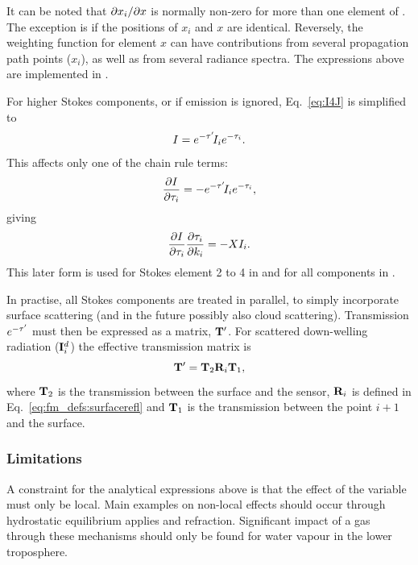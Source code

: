 It can be noted that $\partial x_i/\partial x$ is normally non-zero for more than
one element of \SttVct. The exception is if the positions of $x_i$ and $x$ are
identical. Reversely, the weighting function for element $x$ can have
contributions from several propagation path points ($x_i$), as well as from
several radiance spectra.
The expressions above are implemented in .

For higher Stokes components, or if emission is ignored, Eq.~\ref{eq:I4J} is
simplified to
\begin{equation}
  \label{eq:Q4J}
  I = e^{-\tau'}\!I_ie^{-\tau_{i}}.
\end{equation}
This affects only one of the chain rule terms:
\begin{equation}
  \frac{\partial I}{\partial \tau_{i}} 
      = -e^{-\tau'}\!I_i e^{-\tau_{i}},
\end{equation}
giving
\begin{equation}
  \frac{\partial I}{\partial \tau_{i}}\frac{\partial \tau_{i}}{\partial k_i} =
  -X I_i.
\end{equation}
This later form is used for Stokes element 2 to 4 in
 and for all components in
.

In practise, all Stokes components are treated in parallel, to simply
incorporate surface scattering (and in the future possibly also cloud
scattering). Transmission $e^{-\tau'}$ must then be expressed as a matrix,
$\mathbf{T}'$. For scattered down-welling radiation (${\bf I}^d_i$) the
effective transmission matrix is
\begin{equation}
  \mathbf{T}' = \mathbf{T}_2\mathbf{R}_i\mathbf{T}_1,
\end{equation}
where $\mathbf{T}_2$ is the transmission between the surface and the sensor,
$\mathbf{R}_i$ is defined in Eq.~\ref{eq:fm_defs:surfacerefl} and
$\mathbf{T}_1$ is the transmission between the point $i+1$ and the surface.


\subsubsection{Limitations}
%
A constraint for the analytical expressions above is that the effect of the
variable must only be local. Main examples on non-local effects should occur
through hydrostatic equilibrium applies and refraction. Significant impact of a
gas through these mechanisms should only be found for water vapour in the
lower troposphere.





